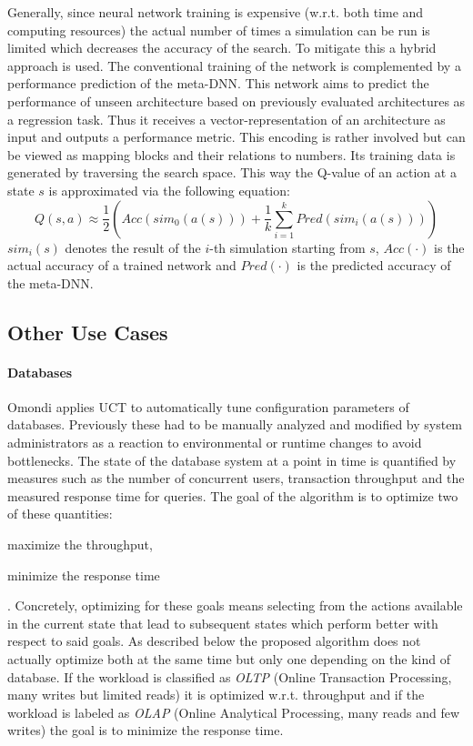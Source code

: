Generally, since neural network training is expensive (w.r.t. both time and computing resources) the actual number of times a simulation can be run is limited which decreases the accuracy of the search. To mitigate this a hybrid approach is used. The conventional training of the network is complemented by a performance prediction of the meta-DNN. This network aims to predict the performance of unseen architecture based on previously evaluated architectures as a regression task. Thus it receives a vector-representation of an architecture as input and outputs a performance metric. This encoding is rather involved but can be viewed as mapping blocks and their relations to numbers. Its training data is generated by traversing the search space. This way the Q-value of an action at a state $s$ is approximated via the following equation:
\begin{equation*}
    Q(s,a) \approx \frac{1}{2} \left(Acc(sim_0(a(s))) + \frac{1}{k} \sum_{i=1}^k Pred(sim_i(a(s))) \right)
\end{equation*} $sim_i(s)$ denotes the result of the $i$-th simulation starting from $s$, $Acc(\cdot)$ is the actual accuracy of a trained network and $Pred(\cdot)$ is the predicted accuracy of the meta-DNN.

\subsection{Other Use Cases}
\label{ss:others}
\paragraph{Databases}
Omondi \cite{omondi2019monte} applies UCT to automatically tune configuration parameters of databases. Previously these had to be manually analyzed and modified by system administrators as a reaction to environmental or runtime changes to avoid bottlenecks. The state of the database system at a point in time is quantified by measures such as the number of concurrent users, transaction throughput and the measured response time for queries. The goal of the algorithm is to optimize two of these quantities: \begin{enumerate*}[label=\roman*)]
    \item maximize the throughput, \item minimize the response time
\end{enumerate*}. Concretely, optimizing for these goals means selecting from the actions available in the current state that lead to subsequent states which perform better with respect to said goals. As described below the proposed algorithm does not actually optimize both at the same time but only one depending on the kind of database. If the workload is classified as \textit{OLTP} (Online Transaction Processing, many writes but limited reads) it is optimized w.r.t. throughput and if the workload is labeled as \textit{OLAP} (Online Analytical Processing, many reads and few writes) the goal is to minimize the response time. 

